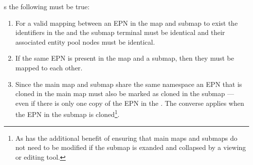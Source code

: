 s the following must be true:

\begin{enumerate}
\item For a valid mapping between an EPN in the map and submap to exist the identifiers in the  and the submap terminal must be identical and their associated entity pool nodes must be identical.
\item If the same EPN is present in the map and a submap, then they must be mapped to each other.
\item Since the main map and submap share the same namespace an EPN that is cloned in the main map must also be
marked as cloned in the submap --- even if there is only one copy of the EPN in the . The converse applies when the EPN in the submap is cloned\footnote{As has the additional benefit of ensuring that main maps and submaps do not need to be modified if the submap is exanded and collapsed by a viewing or editing tool.}.
\end{enumerate}




